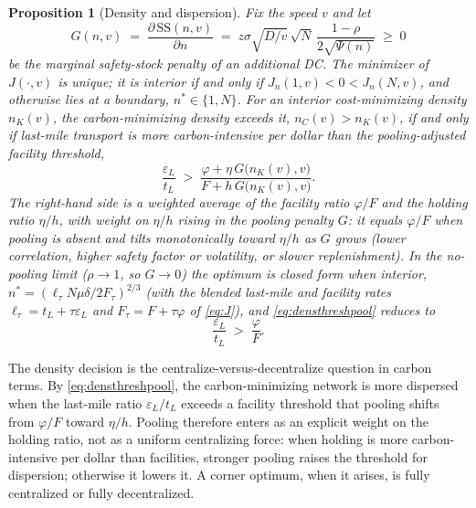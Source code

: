 \documentclass[11pt]{article}
\newtheorem{proposition}{Proposition}
\theoremstyle{definition}
\theoremstyle{remark}
\theoremstyle{plain}
\newcommand{\sstock}{\mathrm{SS}}
\begin{document}
\begin{proposition}[Density and dispersion]\label{prop:density}
Fix the speed $v$ and let
\begin{equation}
  G(n,v)\;=\;\frac{\partial\,\sstock(n,v)}{\partial n}
           \;=\;z\sigma\sqrt{D/v}\,\sqrt{N}\,\frac{1-\rho}{2\sqrt{\Psi(n)}}\;\ge\;0
\end{equation}
be the marginal safety-stock penalty of an additional DC. The minimizer of $J(\cdot,v)$ is unique; it is
interior if and only if $J_n(1,v)<0<J_n(N,v)$, and otherwise lies at a boundary, $n^*\in\{1,N\}$. For an
interior cost-minimizing density $n_K(v)$, the carbon-minimizing density exceeds it, $n_C(v)>n_K(v)$, if and
only if last-mile transport is more carbon-intensive per dollar than the \emph{pooling-adjusted facility threshold},
\begin{equation}\label{eq:densthreshpool}
  \frac{\varepsilon_L}{t_L} \;>\; \frac{\varphi+\eta\,G\big(n_K(v),v\big)}{F+h\,G\big(n_K(v),v\big)} .
\end{equation}
The right-hand side is a weighted average of the facility ratio $\varphi/F$ and the holding ratio $\eta/h$,
with weight on $\eta/h$ rising in the pooling penalty $G$: it equals $\varphi/F$ when pooling is absent and
tilts monotonically toward $\eta/h$ as $G$ grows (lower correlation, higher safety factor or volatility, or
slower replenishment). In the no-pooling limit ($\rho\to1$, so $G\to0$) the optimum is closed form when interior,
$n^*=(\ell_\tau N\mu\delta/2F_\tau)^{2/3}$ (with the blended last-mile and facility rates
$\ell_\tau=t_L+\tau\varepsilon_L$ and $F_\tau=F+\tau\varphi$ of \eqref{eq:J}), and
\eqref{eq:densthreshpool} reduces to
\begin{equation}\label{eq:densitythreshold}
  \frac{\varepsilon_L}{t_L} \;>\; \frac{\varphi}{F}.
\end{equation}
\end{proposition}

\noindent The density decision is the centralize-versus-decentralize question in carbon terms. By
\eqref{eq:densthreshpool}, the carbon-minimizing network is more dispersed when the last-mile ratio
$\varepsilon_L/t_L$ exceeds a facility threshold that pooling shifts from $\varphi/F$ toward $\eta/h$.
Pooling therefore enters as an explicit weight on the holding ratio, not as a uniform centralizing force: when
holding is more carbon-intensive per dollar than facilities, stronger pooling raises the threshold for
dispersion; otherwise it lowers it. A corner optimum, when it arises, is fully centralized or fully
decentralized.
\end{document}
